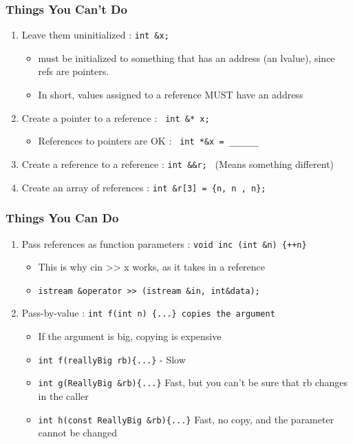 \documentclass{article}
\begin{document}
\subsubsection{Things You Can't Do}
\begin{enumerate}
\item Leave them uninitialized : \verb|int &x;|
\begin{itemize}
\item must be initialized to something that has an address (an lvalue), since refs are pointers.
\item In short, values assigned to a reference MUST have an address
\end{itemize}

\item Create a pointer to a reference : \verb| int &* x;|
\begin{itemize}
\item References to pointers are OK : \verb| int *&x = ______|
\end{itemize}

\item Create a reference to a reference : \verb|int &&r; | (Means something different)
\item Create an array of references : \verb|int &r[3] = {n, n , n};|
\end{enumerate}

\subsubsection{Things You Can Do}
\begin{enumerate}
\item Pass references as function parameters : \verb|void inc (int &n) {++n}|
\begin{itemize}
\item This is why cin >> x works, as it takes in a reference 
\item \verb|istream &operator >> (istream &in, int&data);|
\end{itemize}

\item Pass-by-value : \verb|int f(int n) {...} copies the argument|
\begin{itemize}
\item If the argument is big, copying is expensive 
\item \verb|int f(reallyBig rb){...}| - Slow
\item \verb|int g(ReallyBig &rb){...}| Fast, but you can't be sure that rb changes in the caller 
\item \verb|int h(const ReallyBig &rb){...}| Fast, no copy, and the parameter cannot be changed
\end{itemize}
\end{enumerate}
\end{document}
